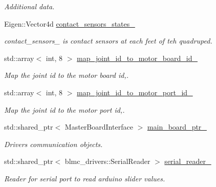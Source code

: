 \begin{DoxyCompactItemize}
\begin{DoxyCompactList}\small\item\em Additional data. \end{DoxyCompactList}\item 
\mbox{\label{classblmc__robots_1_1Solo8_a1593f4a8fbba53c407a4e0434ebe785c}} 
Eigen\+::\+Vector4d \hyperlink{classblmc__robots_1_1Solo8_a1593f4a8fbba53c407a4e0434ebe785c}{contact\+\_\+sensors\+\_\+states\+\_\+}
\begin{DoxyCompactList}\small\item\em contact\+\_\+sensors\+\_\+ is contact sensors at each feet of teh quadruped. \end{DoxyCompactList}\item 
std\+::array$<$ int, 8 $>$ \hyperlink{classblmc__robots_1_1Solo8_a5d04c4cdbd954dc2a76c08989ccf0040}{map\+\_\+joint\+\_\+id\+\_\+to\+\_\+motor\+\_\+board\+\_\+id\+\_\+}
\begin{DoxyCompactList}\small\item\em Map the joint id to the motor board id,. \end{DoxyCompactList}\item 
std\+::array$<$ int, 8 $>$ \hyperlink{classblmc__robots_1_1Solo8_a6c1a5948cf6d2ec18d619753d51b8546}{map\+\_\+joint\+\_\+id\+\_\+to\+\_\+motor\+\_\+port\+\_\+id\+\_\+}
\begin{DoxyCompactList}\small\item\em Map the joint id to the motor port id,. \end{DoxyCompactList}\item 
std\+::shared\+\_\+ptr$<$ Master\+Board\+Interface $>$ \hyperlink{classblmc__robots_1_1Solo8_a7beb3d9ca8cc39e832fb5515bd2e71c5}{main\+\_\+board\+\_\+ptr\+\_\+}
\begin{DoxyCompactList}\small\item\em Drivers communication objects. \end{DoxyCompactList}\item 
\mbox{\label{classblmc__robots_1_1Solo8_ac01d9597b2e0446e29c249f74c6ffc8f}} 
std\+::shared\+\_\+ptr$<$ blmc\+\_\+drivers\+::\+Serial\+Reader $>$ \hyperlink{classblmc__robots_1_1Solo8_ac01d9597b2e0446e29c249f74c6ffc8f}{serial\+\_\+reader\+\_\+}
\begin{DoxyCompactList}\small\item\em Reader for serial port to read arduino slider values. \end{DoxyCompactList}\item 

\end{DoxyCompactItemize}
